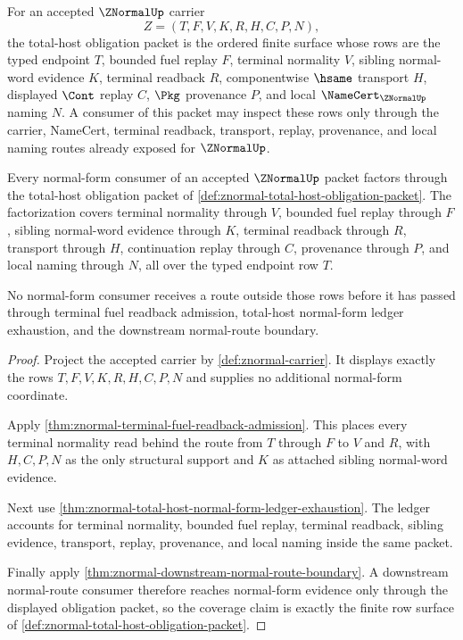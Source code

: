 \begin{definition}
\label{def:znormal-total-host-obligation-packet}
For an accepted $\ZNormalUp$ carrier
$$
Z=(T,F,V,K,R,H,C,P,N),
$$
the total-host obligation packet is the ordered finite surface whose rows are the typed endpoint $T$, bounded fuel replay $F$, terminal normality $V$, sibling normal-word evidence $K$, terminal readback $R$, componentwise $\hsame$ transport $H$, displayed $\Cont$ replay $C$, $\Pkg$ provenance $P$, and local $\NameCert_{\ZNormalUp}$ naming $N$. A consumer of this packet may inspect these rows only through the carrier, NameCert, terminal readback, transport, replay, provenance, and local naming routes already exposed for $\ZNormalUp$.
\end{definition}

\begin{theorem}
\label{thm:znormal-normal-form-consumer-coverage}
Every normal-form consumer of an accepted $\ZNormalUp$ packet factors through the total-host obligation packet of \autoref{def:znormal-total-host-obligation-packet}. The factorization covers terminal normality through $V$, bounded fuel replay through $F$, sibling normal-word evidence through $K$, terminal readback through $R$, transport through $H$, continuation replay through $C$, provenance through $P$, and local naming through $N$, all over the typed endpoint row $T$.

No normal-form consumer receives a route outside those rows before it has passed through terminal fuel readback admission, total-host normal-form ledger exhaustion, and the downstream normal-route boundary.
\end{theorem}
\begin{proof}
Project the accepted carrier by \autoref{def:znormal-carrier}. It displays exactly the rows $T,F,V,K,R,H,C,P,N$ and supplies no additional normal-form coordinate.

Apply \autoref{thm:znormal-terminal-fuel-readback-admission}. This places every terminal normality read behind the route from $T$ through $F$ to $V$ and $R$, with $H,C,P,N$ as the only structural support and $K$ as attached sibling normal-word evidence.

Next use \autoref{thm:znormal-total-host-normal-form-ledger-exhaustion}. The ledger accounts for terminal normality, bounded fuel replay, terminal readback, sibling evidence, transport, replay, provenance, and local naming inside the same packet.

Finally apply \autoref{thm:znormal-downstream-normal-route-boundary}. A downstream normal-route consumer therefore reaches normal-form evidence only through the displayed obligation packet, so the coverage claim is exactly the finite row surface of \autoref{def:znormal-total-host-obligation-packet}.
\end{proof}

